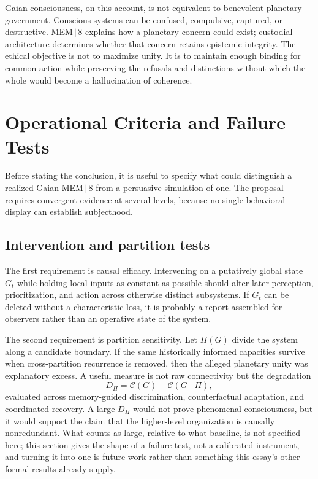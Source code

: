 \documentclass[11pt]{article}
\begin{document}
Gaian consciousness, on this account, is not equivalent to benevolent planetary government. Conscious systems can be confused, compulsive, captured, or destructive. MEM\,$|$\,8 explains how a planetary concern could exist; custodial architecture determines whether that concern retains epistemic integrity. The ethical objective is not to maximize unity. It is to maintain enough binding for common action while preserving the refusals and distinctions without which the whole would become a hallucination of coherence.

\section{Operational Criteria and Failure Tests}

Before stating the conclusion, it is useful to specify what could distinguish a realized Gaian MEM\,$|$\,8 from a persuasive simulation of one. The proposal requires convergent evidence at several levels, because no single behavioral display can establish subjecthood.

\subsection{Intervention and partition tests}
\label{sec:partition-tests}

The first requirement is causal efficacy. Intervening on a putatively global state $G_t$ while holding local inputs as constant as possible should alter later perception, prioritization, and action across otherwise distinct subsystems. If $G_t$ can be deleted without a characteristic loss, it is probably a report assembled for observers rather than an operative state of the system.

The second requirement is partition sensitivity. Let $\Pi(G)$ divide the system along a candidate boundary. If the same historically informed capacities survive when cross-partition recurrence is removed, then the alleged planetary unity was explanatory excess. A useful measure is not raw connectivity but the degradation
\[
D_{\Pi}=\mathcal{C}(G)-\mathcal{C}(G\mid \Pi),
\]
evaluated across memory-guided discrimination, counterfactual adaptation, and coordinated recovery. A large $D_{\Pi}$ would not prove phenomenal consciousness, but it would support the claim that the higher-level organization is causally nonredundant. What counts as large, relative to what baseline, is not specified here; this section gives the shape of a failure test, not a calibrated instrument, and turning it into one is future work rather than something this essay's other formal results already supply.
\end{document}
